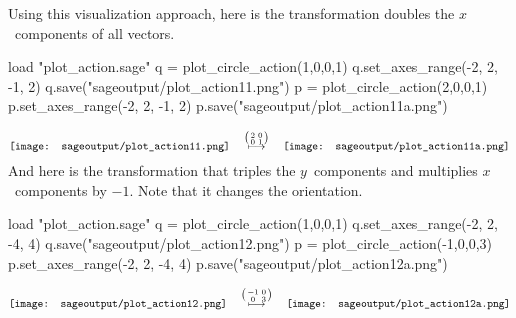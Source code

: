 Using this visualization approach, here 
is the transformation doubles the $x$~components of all vectors. 
\begin{sageoutput}[d,0,4;d,5,7]
load "plot_action.sage"
q = plot_circle_action(1,0,0,1) 
q.set_axes_range(-2, 2, -1, 2) 
q.save("sageoutput/plot_action11.png")
p = plot_circle_action(2,0,0,1) 
p.set_axes_range(-2, 2, -1, 2) 
p.save("sageoutput/plot_action11a.png")
\end{sageoutput}
\begin{equation*}
  \vcenteredhbox{\texttt{[image: sageoutput/plot\_action11.png]}}
  \quad\mapsunder{\big (\begin{smallmatrix} 2 &0 \\ 0 &1 \end{smallmatrix}\big )}\quad
  \vcenteredhbox{\texttt{[image: sageoutput/plot\_action11a.png]}}
\end{equation*}
And here is the
transformation that triples the $y$~components and multiplies 
$x$~components by $-1$. 
Note that it changes the orientation.
\begin{sageoutput}[d,0,4;d,5,7]
load "plot_action.sage"
q = plot_circle_action(1,0,0,1) 
q.set_axes_range(-2, 2, -4, 4) 
q.save("sageoutput/plot_action12.png")
p = plot_circle_action(-1,0,0,3) 
p.set_axes_range(-2, 2, -4, 4) 
p.save("sageoutput/plot_action12a.png")
\end{sageoutput}
\begin{equation*}
  \vcenteredhbox{\texttt{[image: sageoutput/plot\_action12.png]}}
  \quad\mapsunder{\big (\begin{smallmatrix} -1 &0 \\ 0 &3 \end{smallmatrix}\big )}\quad
  \vcenteredhbox{\texttt{[image: sageoutput/plot\_action12a.png]}}
\end{equation*}

